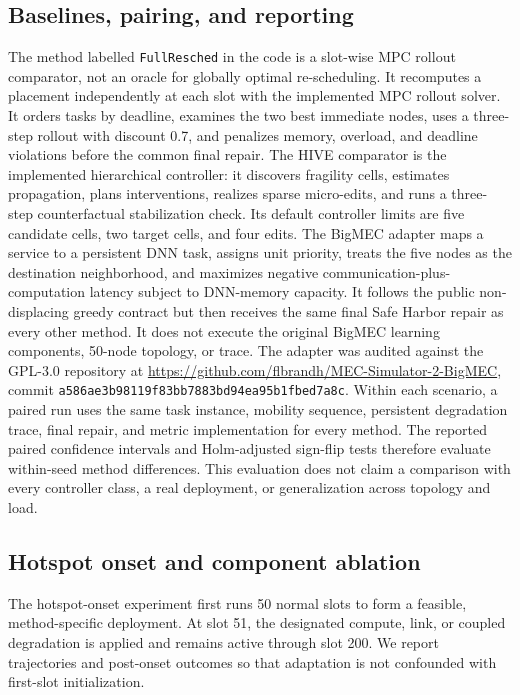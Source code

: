 \documentclass[preprint,12pt]{elsarticle}
\begin{document}
\subsection{Baselines, pairing, and reporting}\label{baselines-pairing-and-reporting}

The method labelled \texttt{FullResched} in the code is a slot-wise MPC
rollout comparator, not an oracle for globally optimal re-scheduling. It
recomputes a placement independently at each slot with the implemented
MPC rollout solver. It orders tasks by deadline, examines
the two best immediate nodes, uses a three-step rollout with discount
0.7, and penalizes memory, overload, and deadline violations before the
common final repair. The HIVE comparator is the implemented hierarchical
controller: it discovers fragility cells, estimates propagation, plans
interventions, realizes sparse micro-edits, and runs a three-step
counterfactual stabilization check. Its default controller limits are
five candidate cells, two target cells, and four edits. The BigMEC adapter
maps a service to a persistent DNN task, assigns unit priority, treats the
five nodes as the destination neighborhood, and maximizes negative
communication-plus-computation latency subject to DNN-memory capacity.
It follows the public non-displacing greedy contract but then receives the
same final Safe Harbor repair as every other method. It does not execute
the original BigMEC learning components, 50-node topology, or trace.
The adapter was audited against the GPL-3.0 repository at
\url{https://github.com/flbrandh/MEC-Simulator-2-BigMEC}, commit
\texttt{a586ae3b98119f83bb7883bd94ea95b1fbed7a8c}.
Within each
scenario, a paired run uses the same task instance, mobility sequence,
persistent degradation trace, final repair, and metric implementation
for every method. The reported paired confidence intervals and
Holm-adjusted sign-flip tests therefore evaluate within-seed method
differences. This evaluation does not claim a comparison with every
controller class, a real deployment, or generalization across topology
and load.

\subsection{Hotspot onset and component ablation}\label{hotspot-onset-and-component-ablation}

The hotspot-onset experiment first runs 50 normal slots to form a feasible,
method-specific deployment. At slot 51, the designated compute, link, or
coupled degradation is applied and remains active through slot 200. We
report trajectories and post-onset outcomes so that adaptation is not
confounded with first-slot initialization.
\end{document}
